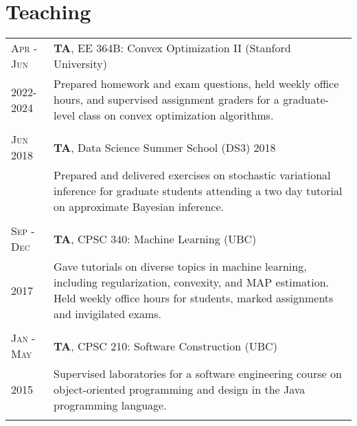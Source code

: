 \documentclass[10pt]{article}
\newcommand{\spacing}{\vspace{0.5cm}}
\begin{document}
\spacing
\spacing

\section{Teaching}
\begin{longtable}
    {R{1.8cm}|L{11.8cm}}
    \textsc{Apr - Jun}      & \textbf{TA}, EE 364B: Convex Optimization II (Stanford University)                                                                                                       \\
    \vspace{0.3cm}2022-2024 & {\small Prepared homework and exam questions, held weekly office hours, and supervised assignment graders for a graduate-level class on convex optimization algorithms.} \\   \\
    \textsc{ Jun 2018}      & \textbf{TA}, Data Science Summer School (DS3) 2018                                                                                                                       \\
                            & {\small Prepared and delivered exercises on stochastic variational inference for graduate students attending a two day tutorial on approximate Bayesian inference.}      \\  \\
    \textsc{Sep - Dec}      & \textbf{TA}, CPSC 340: Machine Learning                          (UBC)                                                                                                   \\
    \vspace{0.7cm} 2017     & {\small Gave tutorials on diverse topics in machine learning, including regularization, convexity, and MAP estimation.
            Held weekly office hours for students, marked assignments and invigilated
            exams.
    }                                                                                                                                                                                                  \\  \\
    \textsc{Jan - May}      & \textbf{TA}, CPSC 210: Software Construction                     (UBC)                                                                                                   \\
    \vspace{0.2cm}2015      & {\small Supervised laboratories for a software engineering course on object-oriented programming and design in the Java programming language.}                           \\  \\

\end{longtable}
\end{document}
